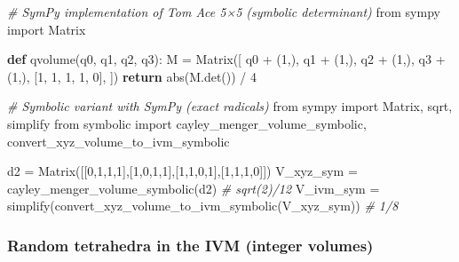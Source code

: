 \documentclass[
]{article}
\newenvironment{Shaded}{}{}
\newcommand{\BuiltInTok}[1]{#1}
\newcommand{\CommentTok}[1]{\textcolor[rgb]{0.38,0.63,0.69}{\textit{#1}}}
\newcommand{\ControlFlowTok}[1]{\textcolor[rgb]{0.00,0.44,0.13}{\textbf{#1}}}
\newcommand{\DecValTok}[1]{\textcolor[rgb]{0.25,0.63,0.44}{#1}}
\newcommand{\ImportTok}[1]{#1}
\newcommand{\KeywordTok}[1]{\textcolor[rgb]{0.00,0.44,0.13}{\textbf{#1}}}
\newcommand{\NormalTok}[1]{#1}
\newcommand{\OperatorTok}[1]{\textcolor[rgb]{0.40,0.40,0.40}{#1}}
\begin{document}
\begin{Shaded}
\begin{Highlighting}[]
\CommentTok{\# SymPy implementation of Tom Ace 5×5 (symbolic determinant)}
\ImportTok{from}\NormalTok{ sympy }\ImportTok{import}\NormalTok{ Matrix}

\KeywordTok{def}\NormalTok{ qvolume(q0, q1, q2, q3):}
\NormalTok{    M }\OperatorTok{=}\NormalTok{ Matrix([}
\NormalTok{        q0 }\OperatorTok{+}\NormalTok{ (}\DecValTok{1}\NormalTok{,),}
\NormalTok{        q1 }\OperatorTok{+}\NormalTok{ (}\DecValTok{1}\NormalTok{,),}
\NormalTok{        q2 }\OperatorTok{+}\NormalTok{ (}\DecValTok{1}\NormalTok{,),}
\NormalTok{        q3 }\OperatorTok{+}\NormalTok{ (}\DecValTok{1}\NormalTok{,),}
\NormalTok{        [}\DecValTok{1}\NormalTok{, }\DecValTok{1}\NormalTok{, }\DecValTok{1}\NormalTok{, }\DecValTok{1}\NormalTok{, }\DecValTok{0}\NormalTok{],}
\NormalTok{    ])}
    \ControlFlowTok{return} \BuiltInTok{abs}\NormalTok{(M.det()) }\OperatorTok{/} \DecValTok{4}
\end{Highlighting}
\end{Shaded}

\begin{Shaded}
\begin{Highlighting}[]
\CommentTok{\# Symbolic variant with SymPy (exact radicals)}
\ImportTok{from}\NormalTok{ sympy }\ImportTok{import}\NormalTok{ Matrix, sqrt, simplify}
\ImportTok{from}\NormalTok{ symbolic }\ImportTok{import}\NormalTok{ cayley\_menger\_volume\_symbolic, convert\_xyz\_volume\_to\_ivm\_symbolic}

\NormalTok{d2 }\OperatorTok{=}\NormalTok{ Matrix([[}\DecValTok{0}\NormalTok{,}\DecValTok{1}\NormalTok{,}\DecValTok{1}\NormalTok{,}\DecValTok{1}\NormalTok{],[}\DecValTok{1}\NormalTok{,}\DecValTok{0}\NormalTok{,}\DecValTok{1}\NormalTok{,}\DecValTok{1}\NormalTok{],[}\DecValTok{1}\NormalTok{,}\DecValTok{1}\NormalTok{,}\DecValTok{0}\NormalTok{,}\DecValTok{1}\NormalTok{],[}\DecValTok{1}\NormalTok{,}\DecValTok{1}\NormalTok{,}\DecValTok{1}\NormalTok{,}\DecValTok{0}\NormalTok{]])}
\NormalTok{V\_xyz\_sym }\OperatorTok{=}\NormalTok{ cayley\_menger\_volume\_symbolic(d2)      }\CommentTok{\# sqrt(2)/12}
\NormalTok{V\_ivm\_sym }\OperatorTok{=}\NormalTok{ simplify(convert\_xyz\_volume\_to\_ivm\_symbolic(V\_xyz\_sym))  }\CommentTok{\# 1/8}
\end{Highlighting}
\end{Shaded}

\hypertarget{random-tetrahedra-in-the-ivm-integer-volumes}{%
\subsubsection{Random tetrahedra in the IVM (integer
volumes)}\label{random-tetrahedra-in-the-ivm-integer-volumes}}
\end{document}
